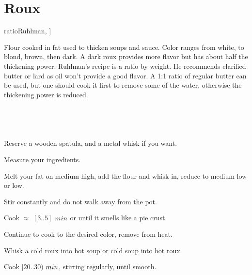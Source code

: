 \section[Roux]{Roux}

\begin{recipestats}[
        bakingtime=30~\minute,
        original=\citetitle{ratioRuhlman}~\cite[p.~113]{ratioRuhlman},
    ]
\end{recipestats}

\begin{recipeabstract}
    Flour cooked in fat used to thicken soups and sauce.
    Color ranges from white, to blond, brown, then dark.
    A dark roux provides more flavor but has about half the thickening power\cite{ratioRuhlman}.
    Ruhlman's recipe is a ratio by weight.
    He recommends clarified butter or lard as oil won't provide a good flavor.
    A 1:1 ratio of regular butter can be used, but one should cook it first to remove some of the water,
    otherwise the thickening power is reduced.
\end{recipeabstract}

\begin{ingredientcolumns}
    \begin{ingredientblock}[roux]
        \\
    \end{ingredientblock}

    \begin{ingredientblock}[thickening]
        \\
    \end{ingredientblock}
\end{ingredientcolumns}

\begin{preparation}
\item Reserve a wooden spatula, and a metal whisk if you want.
\item Measure your ingredients.
\item Melt your fat on medium high, add the flour and whisk in, reduce to medium low or low.
\item Stir constantly and do not walk away from the pot.
\item Cook $\approx$ $[3..5]$ $\minute$ or until it smells like a pie crust.
\item Continue to cook to the desired color, remove from heat.
\item Whisk a cold roux into hot soup or cold soup into hot roux.
\item Cook $[20..30)$ $\minute$, stirring regularly, until smooth.
\end{preparation}

